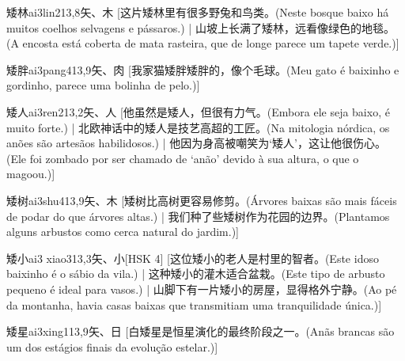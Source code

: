 \begin{entry}{矮林}{ai3lin2}{13,8}{⽮、⽊}
  [这片矮林里有很多野兔和鸟类。(Neste bosque baixo há muitos coelhos selvagens e pássaros.) | 山坡上长满了矮林，远看像绿色的地毯。(A encosta está coberta de mata rasteira, que de longe parece um tapete verde.)]
\end{entry}

\begin{entry}{矮胖}{ai3pang4}{13,9}{⽮、⾁}
  [我家猫矮胖矮胖的，像个毛球。(Meu gato é baixinho e gordinho, parece uma bolinha de pelo.)]
\end{entry}

\begin{entry}{矮人}{ai3ren2}{13,2}{⽮、⼈}
  [他虽然是矮人，但很有力气。(Embora ele seja baixo, é muito forte.) | 北欧神话中的矮人是技艺高超的工匠。(Na mitologia nórdica, os anões são artesãos habilidosos.) | 他因为身高被嘲笑为‘矮人’，这让他很伤心。(Ele foi zombado por ser chamado de ‘anão’ devido à sua altura, o que o magoou.)]
\end{entry}

\begin{entry}{矮树}{ai3shu4}{13,9}{⽮、⽊}
  [矮树比高树更容易修剪。(Árvores baixas são mais fáceis de podar do que árvores altas.) | 我们种了些矮树作为花园的边界。(Plantamos alguns arbustos como cerca natural do jardim.)]
\end{entry}

\begin{entry}{矮小}{ai3 xiao3}{13,3}{⽮、⼩}[HSK 4]
  [这位矮小的老人是村里的智者。(Este idoso baixinho é o sábio da vila.) | 这种矮小的灌木适合盆栽。(Este tipo de arbusto pequeno é ideal para vasos.) | 山脚下有一片矮小的房屋，显得格外宁静。(Ao pé da montanha, havia casas baixas que transmitiam uma tranquilidade única.)]
\end{entry}

\begin{entry}{矮星}{ai3xing1}{13,9}{⽮、⽇}
  [白矮星是恒星演化的最终阶段之一。(Anãs brancas são um dos estágios finais da evolução estelar.)]
\end{entry}

